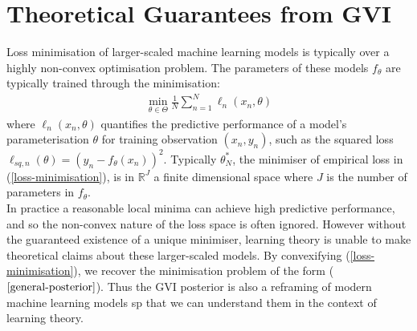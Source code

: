 \documentclass[twoside,11pt]{article}
\newcommand{\jk}[1]{{\color{blue} [JK: #1]}}
\begin{document}
\section{Theoretical Guarantees from GVI \cite{wild2023rigorous}}
Loss minimisation of larger-scaled machine learning models is typically over a highly non-convex optimisation problem. The parameters of these models $f_{\theta}$ are typically trained through the minimisation:
\begin{align}
\min_{\theta \in \Theta} \frac{1}{N}\sum_{n=1}^N\ell_n(x_n, \theta)
\label{loss-minimisation}
\end{align}
where $\ell_n(x_n, \theta)$ quantifies the predictive performance of a model's parameterisation $\theta$ for training observation $(x_n, y_n)$, such as the squared loss $\ell_{sq, n}(\theta) = \left(y_n - f_{\theta}(x_n)\right)^2$. Typically $\theta_N^*$, the minimiser of empirical loss in (\ref{loss-minimisation}), is in $ \mathbb{R}^J$ a finite dimensional space where $J$ is the number of parameters in $f_{\theta}$.\\
\newline
In practice a reasonable local minima can achieve high predictive performance, and so the non-convex nature of the loss space is often ignored.
%
%
However without the guaranteed existence of a unique minimiser, learning theory is unable to make theoretical claims about these larger-scaled models. By convexifying (\ref{loss-minimisation}), we recover the minimisation problem of the form ($\ref{general-posterior}$). Thus the GVI posterior is also a reframing of modern machine learning models sp that we can understand them in the context of learning theory.
\end{document}
